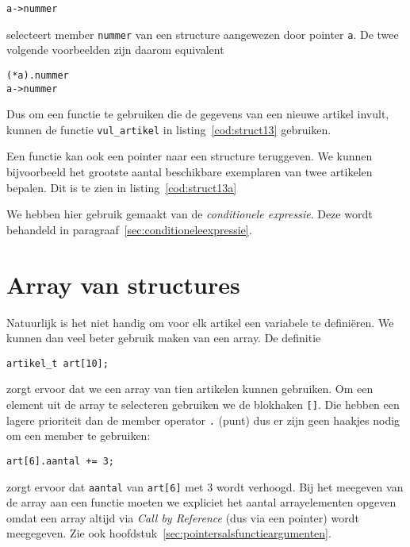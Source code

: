\hspace*{1em}\texttt{a->nummer}

selecteert member \texttt{nummer} van een structure aangewezen door pointer \texttt{a}. De twee volgende voorbeelden zijn daarom equivalent

\hspace*{1em}\texttt{(*a).nummer}\\
\hspace*{1em}\texttt{a->nummer}

Dus om een functie te gebruiken die de gegevens van een nieuwe artikel invult, kunnen de functie \texttt{vul\_artikel} in listing~\ref{cod:struct13} gebruiken.


Een functie kan ook een pointer naar een structure teruggeven. We kunnen bijvoorbeeld het grootste aantal beschikbare exemplaren van twee artikelen bepalen. Dit is te zien in listing~\ref{cod:struct13a}


We hebben hier gebruik gemaakt van de \textsl{conditionele expressie}. Deze wordt behandeld in paragraaf~\ref{sec:conditioneleexpressie}.

\section{Array van structures}
Natuurlijk is het niet handig om voor elk artikel een variabele te definiëren. We kunnen dan veel beter gebruik maken van een array. De definitie

\hspace*{1em}\texttt{artikel\_t art[10];}

zorgt ervoor dat we een array van tien artikelen kunnen gebruiken. Om een element uit de array te selecteren gebruiken we de blokhaken \texttt{[]}. Die hebben een lagere prioriteit dan de member operator \texttt{.} (punt) dus er zijn geen haakjes nodig om een member te gebruiken:

\hspace*{1em}\texttt{art[6].aantal += 3;}

zorgt ervoor dat \texttt{aantal} van \texttt{art[6]} met 3 wordt verhoogd. Bij het meegeven van de array aan een functie moeten we expliciet het aantal arrayelementen opgeven omdat een array altijd via \textsl{Call by Reference} (dus via een pointer) wordt meegegeven. Zie ook hoofdstuk~\ref{sec:pointersalsfunctieargumenten}.

